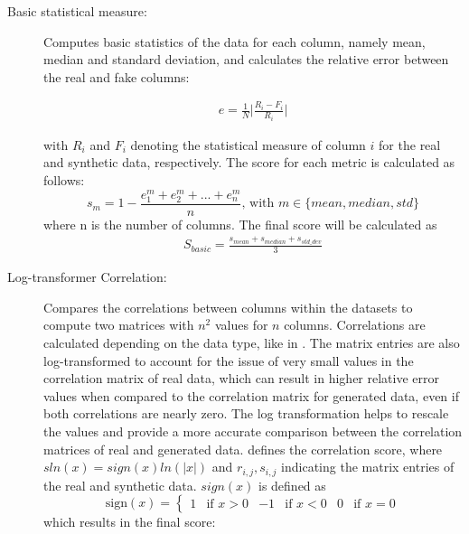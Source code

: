 \begin{description}
  \item[Basic statistical measure:]
  Computes basic statistics of the data for each column, namely mean, median and standard deviation, and calculates the relative error between the real and fake columns:
  
  \begin{equation}
    \begin{align*}
      \label{eqn:rel_err}
      e=\frac{1}{N} \bigg| \frac{R_i-F_i}{R_i} \bigg| 
      \end{align*}
  \end{equation}

  with $R_i$ and $F_i$ denoting the statistical measure of column $i$ for the real and synthetic data, respectively.
  The score for each metric is calculated as follows:
  $$s_m = 1-\frac{e^m_1+e^m_2+...+e^m_n}{n} \textrm{, with }m \in \{mean, median, std\}$$
  where n is the number of columns.
  The final score will be calculated as
  \begin{equation}
    \begin{align*}
      \label{eqn:s_basic}
      S_{basic} = \frac{s_{mean}+s_{median}+s_{std\_dev}}{3}
      \end{align*}
  \end{equation}


  \item[Log-transformer Correlation:]
  Compares the correlations between columns within the datasets to compute two matrices with $n^2$ values for $n$ columns.
  Correlations are calculated depending on the data type, like in \cite{brenninkmeijer2019GenerationEvaluationTabular}.
  The matrix entries are also log-transformed to account for the issue of very small values in the correlation matrix of real data, which can result in higher relative error values when compared to the correlation matrix for generated data, even if both correlations are nearly zero. 
  The log transformation helps to rescale the values and provide a more accurate comparison between the correlation matrices of real and generated data.
   defines the correlation score, where $sln(x) = sign(x)ln(|x|)$ and $r_{i,j}, s_{i,j}$ indicating the matrix entries of the real and synthetic data.
  $sign(x)$ is defined as
  $$\textrm{sign}(x) = \begin{cases}1 & \text{if } x > 0 & -1 & \text{if } x < 0 & 0 & \text{if } x = 0\end{cases}$$
  which results in the final score:
  

\end{description}
